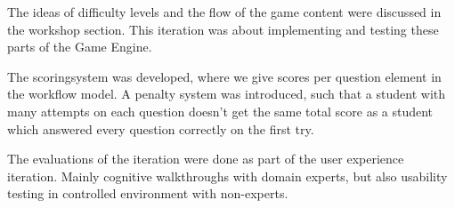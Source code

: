 The ideas of difficulty levels and the flow of the game content were discussed in the workshop section. This iteration was about implementing and testing these parts of the Game Engine.

The scoringsystem was developed, where we give scores per question element in the workflow model.  A penalty system was introduced, such that a student with many attempts on each question doesn't get the same total score as a student which answered every question correctly on the first try.

The evaluations of the iteration were done as part of the user experience iteration. Mainly cognitive walkthroughs with domain experts, but also usability testing in controlled environment with non-experts.
